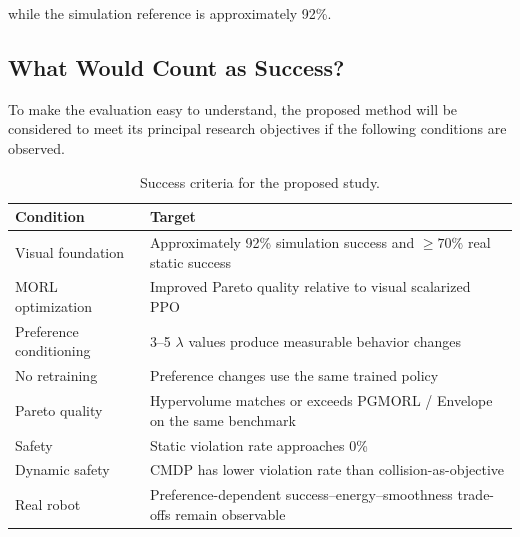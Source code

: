 \documentclass[journal]{IEEEtran}
\begin{document}
while the simulation reference is approximately 92\%.


\subsection{What Would Count as Success?}

To make the evaluation easy to understand, the proposed method will be
considered to meet its principal research objectives if the following
conditions are observed.

\begin{table}[t]
\centering
\caption{Success criteria for the proposed study.}
\label{tab:success_criteria}
\renewcommand{\arraystretch}{1.25}

\begin{tabular}{l l}
\toprule
\textbf{Condition}
&
\textbf{Target}
\\
\midrule

Visual foundation
&
Approximately 92\% simulation success and $\geq70\%$ real static
success
\\

MORL optimization
&
Improved Pareto quality relative to visual scalarized PPO
\\

Preference conditioning
&
3--5 $\lambda$ values produce measurable behavior changes
\\

No retraining
&
Preference changes use the same trained policy
\\

Pareto quality
&
Hypervolume matches or exceeds PGMORL / Envelope on the same benchmark
\\

Safety
&
Static violation rate approaches 0\%
\\

Dynamic safety
&
CMDP has lower violation rate than collision-as-objective
\\

Real robot
&
Preference-dependent success--energy--smoothness trade-offs remain
observable
\\

\bottomrule
\end{tabular}
\end{table}
\end{document}
